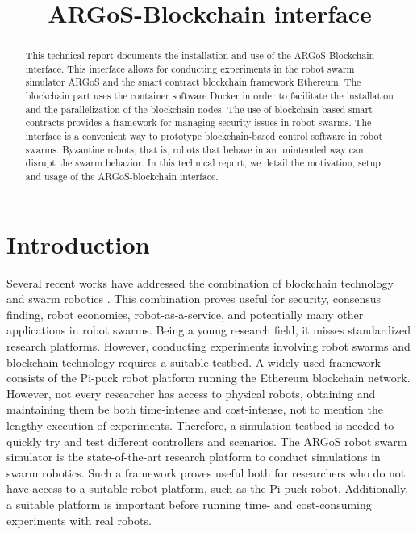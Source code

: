 \documentclass{article}
\title{ARGoS-Blockchain interface}
\begin{document}
\maketitle

\begin{abstract}
  This technical report documents the installation and use of the
  ARGoS-Blockchain interface. This interface allows for conducting
  experiments in the robot swarm simulator ARGoS and the smart
  contract blockchain framework Ethereum. The blockchain part uses the
  container software Docker in order to facilitate the installation
  and the parallelization of the blockchain nodes. The use of
  blockchain-based smart contracts provides a framework for managing
  security issues in robot swarms. The interface is a convenient way
  to prototype blockchain-based control software in robot
  swarms. Byzantine robots, that is, robots that behave in an
  unintended way can disrupt the swarm behavior. In this technical
  report, we detail the motivation, setup, and usage of the
  ARGoS-blockchain interface.
\end{abstract}

\section{Introduction}

Several recent works have addressed the combination of blockchain
technology and swarm robotics
\cite{StrCasDor2018:aamas,StrDor2018:ants,StrFerDor2017:techreport-013,Cas2016:arxiv,PacStrDor2020:techreport-001,PacStrDor2020:techreport-007}. This
combination proves useful for security, consensus finding, robot
economies, robot-as-a-service, and potentially many other applications
in robot swarms. Being a young research field, it misses standardized
research platforms. However, conducting experiments involving robot
swarms and blockchain technology requires a suitable testbed. A widely
used framework consists of the Pi-puck robot platform running the
Ethereum blockchain network. However, not every researcher has access
to physical robots, obtaining and maintaining them be both
time-intense and cost-intense, not to mention the lengthy execution of
experiments. Therefore, a simulation testbed is needed to quickly try
and test different controllers and scenarios. The ARGoS robot swarm
simulator \citep{PinTriOGr-etal2012:si} is the state-of-the-art
research platform to conduct simulations in swarm robotics. Such a
framework proves useful both for researchers who do not have access to
a suitable robot platform, such as the Pi-puck robot. Additionally, a
suitable platform is important before running time- and cost-consuming
experiments with real robots.
\end{document}
